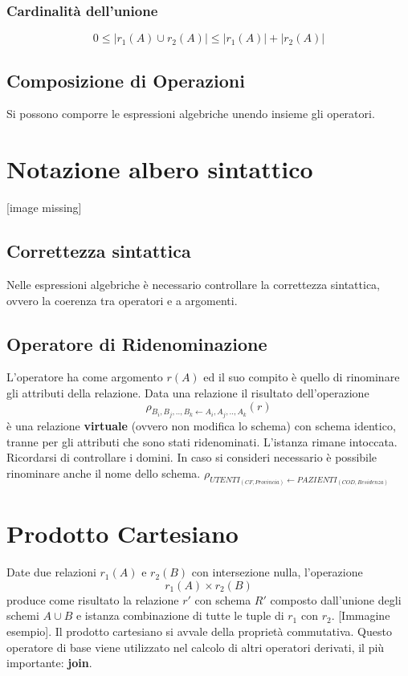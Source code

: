 \documentclass[10pt,twocolumn]{article}
\begin{document}
\subsubsection{Cardinalità dell'unione}
\[0 \leq |r_1 (A) \cup r_2 (A)| \leq |r_1(A)|+|r_2(A)|\]
\subsection{Composizione di Operazioni}
Si possono comporre le espressioni algebriche unendo insieme gli operatori.


\section{Notazione albero sintattico}
[image missing]
\subsection{Correttezza sintattica}
Nelle espressioni algebriche è necessario controllare la correttezza sintattica, ovvero la coerenza tra operatori e a argomenti.

\subsection{Operatore di Ridenominazione}
L'operatore ha come argomento $r(A)$ ed il suo compito è quello di rinominare gli attributi della relazione.
Data una relazione il risultato dell'operazione \[ \rho_{B_i,B_j,..,B_k \leftarrow A_i,A_j,..,A_k}(r)\]
è una relazione \textbf{virtuale} (ovvero non modifica lo schema) con schema identico, tranne per gli attributi che sono stati ridenominati. L'istanza rimane intoccata. Ricordarsi di controllare i domini. In caso si consideri necessario è possibile rinominare anche il nome dello schema. $\rho_{UTENTI_{(CF,Provincia)} \leftarrow PAZIENTI_{(COD,Residenza)}}$
\section{Prodotto Cartesiano}
Date due relazioni $r_1(A)$ e $r_2(B)$ con intersezione nulla, l'operazione \[r_1(A) \times r_2(B)\] produce come risultato la relazione $r'$ con schema $R'$ composto dall'unione degli schemi $A\cup B$ e istanza combinazione di tutte le tuple di $r_1$ con $r_2$. [Immagine esempio]. Il prodotto cartesiano si avvale della proprietà commutativa. Questo operatore di base viene utilizzato nel calcolo di altri operatori derivati, il più importante: \textbf{join}.
\end{document}

